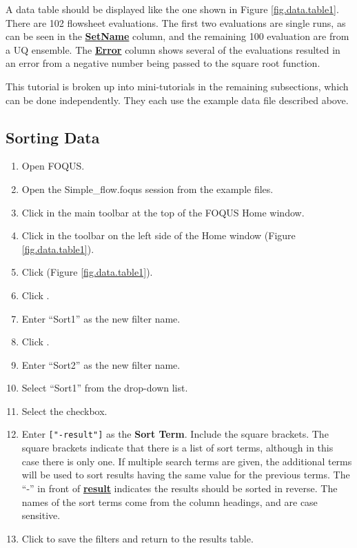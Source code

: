 A data table should be displayed like the one shown in Figure \ref{fig.data.table1}.  There are 102 flowsheet evaluations.  The first two evaluations are single runs, as can be seen in the \textbf{\underline{SetName}} column, and the remaining 100 evaluation are from a UQ ensemble.  The \textbf{\underline{Error}} column shows several of the evaluations resulted in an error from a negative number being passed to the square root function.

This tutorial is broken up into mini-tutorials in the remaining subsections, which can be done independently.  They each use the example data file described above.

\subsection{Sorting Data}

\begin{enumerate}
	\item Open FOQUS.
	\item Open the Simple\_flow.foqus session from the example files.
	\item Click  in the main toolbar at the top of the FOQUS Home window.
	\item Click  in the toolbar on the left side of the Home window (Figure \ref{fig.data.table1}).
	\item Click  (Figure \ref{fig.data.table1}).
	\item Click .
	\item Enter ``Sort1'' as the new filter name.
	\item Click .
	\item Enter ``Sort2'' as the new filter name.
	\item Select ``Sort1'' from the  drop-down list.
	\item Select the  checkbox.
	\item Enter \verb|["-result"]| as the \textbf{Sort Term\underline{}}. Include the square brackets. The square brackets indicate that there is a list of sort terms, although in this case there is only one. If multiple search terms are given, the additional terms will be used to sort results having the same value for the previous terms. The ``-'' in front of \textbf{\underline{result}} indicates the results should be sorted in reverse.  The names of the sort terms come from the column headings, and are case sensitive.
	\item Click  to save the filters and return to the results table.
\end{enumerate}

